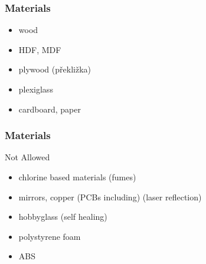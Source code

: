 \documentclass[14pt]{beamer}
\begin{document}






\begin{frame}
\frametitle{Materials}


\begin{examples}
	\begin{itemize}
		\item wood
		\item HDF, MDF
		\item plywood (překližka)
		\item plexiglass
		\item cardboard, paper
	\end{itemize}
\end{examples}




\end{frame}

\begin{frame}
\frametitle{Materials}

\begin{alertblock}{Not Allowed}
	\begin{itemize}
		\item chlorine based materials (fumes)
		\item mirrors, copper (PCBs including) (laser reflection)
		\item hobbyglass (self healing)
		\item polystyrene foam
		\item ABS
	\end{itemize}
\end{alertblock}

\end{frame}
\end{document}
